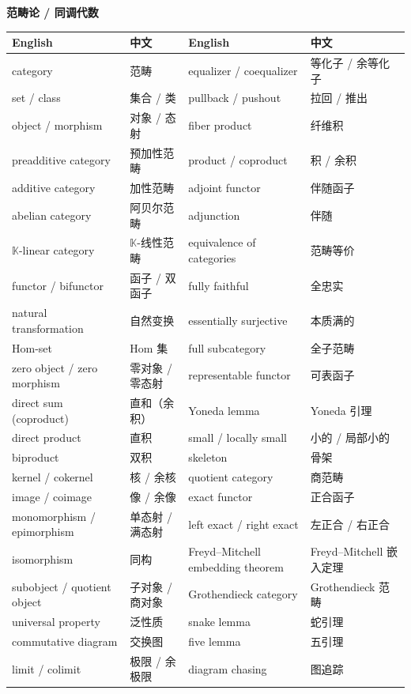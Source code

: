 \vspace{0.8em}
\noindent\textbf{范畴论 / 同调代数}\par\nobreak
\vspace{0.3em}
{\small
\begin{longtable}{p{}p{}p{}p{}}
\toprule
English & 中文 & English & 中文 \\
\midrule
\endhead
category & 范畴 & equalizer / coequalizer & 等化子 / 余等化子\\
set / class & 集合 / 类 & pullback / pushout & 拉回 / 推出\\
object / morphism & 对象 / 态射 & fiber product & 纤维积\\
preadditive category & 预加性范畴 & product / coproduct & 积 / 余积\\
additive category & 加性范畴 & adjoint functor & 伴随函子\\
abelian category & 阿贝尔范畴 & adjunction & 伴随\\
$\mathbb{K}$-linear category & $\mathbb{K}$-线性范畴 & equivalence of categories & 范畴等价\\
functor / bifunctor & 函子 / 双函子 & fully faithful & 全忠实\\
natural transformation & 自然变换 & essentially surjective & 本质满的\\
Hom-set & Hom 集 & full subcategory & 全子范畴\\
zero object / zero morphism & 零对象 / 零态射 & representable functor & 可表函子\\
direct sum (coproduct) & 直和（余积） & Yoneda lemma & Yoneda 引理\\
direct product & 直积 & small / locally small & 小的 / 局部小的\\
biproduct & 双积 & skeleton & 骨架\\
kernel / cokernel & 核 / 余核 & quotient category & 商范畴\\
image / coimage & 像 / 余像 & exact functor & 正合函子\\
monomorphism / epimorphism & 单态射 / 满态射 & left exact / right exact & 左正合 / 右正合\\
isomorphism & 同构 & Freyd–Mitchell embedding theorem & Freyd–Mitchell 嵌入定理\\
subobject / quotient object & 子对象 / 商对象 & Grothendieck category & Grothendieck 范畴\\
universal property & 泛性质 & snake lemma & 蛇引理\\
commutative diagram & 交换图 & five lemma & 五引理\\
limit / colimit & 极限 / 余极限 & diagram chasing & 图追踪\\
\bottomrule
\end{longtable}}

